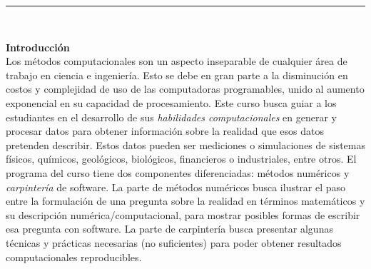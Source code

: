 \documentclass[letterpaper,10pt,onecolumn]{article}
\begin{document}




\noindent\rule{\textwidth}{1pt}\\[-0.1cm]

\addtocounter{mysection}{1}

\noindent\textbf{\large {} \quad Introducci\'on}\\[-0.2cm]


\noindent\normalsize Los m\'etodos computacionales son un aspecto
inseparable de cualquier \'area de trabajo en ciencia e ingenier\'ia.
Esto se debe en gran parte a la disminuci\'on en costos y complejidad
de uso de las computadoras programables, unido al aumento
exponencial en su capacidad de procesamiento.
Este curso busca guiar a los estudiantes en el desarrollo de sus
\emph{habilidades computacionales} en generar y procesar
datos para obtener informaci\'on sobre la realidad que esos datos
pretenden  describir.  
Estos datos pueden ser mediciones o simulaciones de
sistemas f\'isicos, qu\'imicos, geol\'ogicos, biol\'ogicos,
financieros o industriales, entre otros.     
El programa del curso tiene dos componentes diferenciadas: m\'etodos
num\'ericos  y \emph{carpinter\'ia} de software.  
La parte de m\'etodos num\'ericos busca ilustrar el paso entre la
formulaci\'on de una pregunta sobre la realidad en t\'erminos
matem\'aticos y su descripci\'on num\'erica/computacional, para
mostrar posibles formas de escribir esa pregunta con software.   
La parte de carpinter\'ia busca presentar algunas t\'ecnicas y
pr\'acticas necesarias (no suficientes) para poder obtener resultados
computacionales reproducibles.   
\\[0.1cm] 
\end{document}
